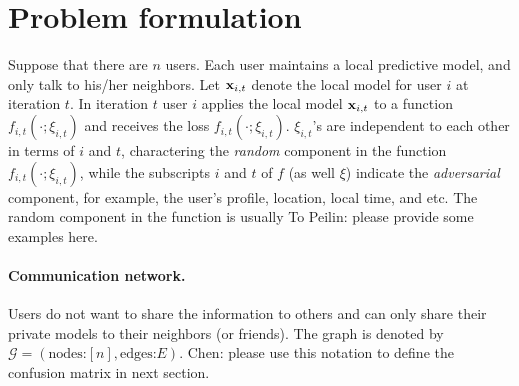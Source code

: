 \documentclass{article}
\def\rc{\color {red}}
\begin{document}
\section{Problem formulation}

Suppose that there are $n$ users. Each user maintains a local predictive model, and only talk to his/her neighbors. Let ${\bf x}_{i, t}$ denote the local model for user $i$ at iteration $t$. In iteration $t$ user $i$ applies the local model ${\bf x}_{i,t}$ to a function $f_{i,t}(\cdot; \xi_{i,t})$ and receives the loss $f_{i,t}(\cdot; \xi_{i,t})$. $\xi_{i,t}$'s are independent to each other in terms of $i$ and $t$, charactering the \emph{random} component in the function $f_{i,t}(\cdot; \xi_{i,t})$, while the subscripts $i$ and $t$ of $f$ (as well $\xi$) indicate the \emph{adversarial} component, for example, the user's profile, location, local time, and etc. The random component in the function is usually {\rc To Peilin: please provide some examples here.}

\paragraph{Communication network.} Users do not want to share the information to others and can only share their private models to their neighbors (or friends). The graph is denoted by $\mathcal{G}=(\text{nodes:} [n], \text{edges:} E)$. {\rc Chen: please use this notation to define the confusion matrix in next section.}
\end{document}
